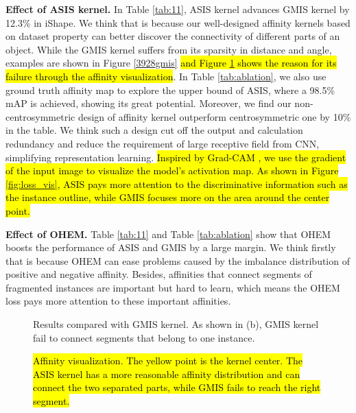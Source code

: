\textbf{Effect of ASIS kernel.} In Table \ref{tab:11}, ASIS kernel advances GMIS kernel by 12.3\% in iShape. We think that is because our well-designed affinity kernels based on dataset property can better discover the connectivity of different parts of an object. While the GMIS kernel suffers from its sparsity in distance and angle, examples are shown in Figure \ref{3928gmis} \hl{and Figure \ref{fig:aff_vis} shows the reason for its failure through the affinity visualization}. In Table \ref{tab:ablation}, we also use ground truth affinity map to explore the upper bound of ASIS, where a 98.5\% mAP is achieved, showing its great potential. Moreover, we find our non-centrosymmetric design of affinity kernel outperform centrosymmetric one by 10\% in the table. We think such a design cut off the output and calculation redundancy and reduce the requirement of large receptive field from CNN, simplifying representation learning. \hl{Inspired by Grad-CAM \cite{selvaraju2017grad}, we use the gradient of the input image to visualize the model's activation map. As shown in Figure \ref{fig:loss_vis}, ASIS pays more attention to the discriminative information such as the instance outline, while GMIS focuses more on the area around the center point.}

\textbf{Effect of OHEM.} Table \ref{tab:11} and Table \ref{tab:ablation} show that OHEM boosts the performance of ASIS and GMIS by a large margin. We think firstly that is because OHEM can ease problems caused by the imbalance distribution of positive and negative affinity. Besides, affinities that connect segments of fragmented instances are important but hard to learn, which means the OHEM loss pays more attention to these important affinities. 

\begin{figure}
\centering
    {\begin{minipage}[t]{0.45\linewidth}
    \caption{Results compared with GMIS kernel. As shown in (b), GMIS kernel fail to connect segments that belong to one instance.}
    \label{fig:badcase}
    \end{minipage}}
    \hspace{5mm}
    {\begin{minipage}[t]{0.45\linewidth}
    \caption{\hl{Affinity visualization. The yellow point is the kernel center. The ASIS kernel has a more reasonable affinity distribution and can connect the two separated parts, while GMIS fails to reach the right segment.}}
    \label{fig:aff_vis}
    \end{minipage}}
\end{figure}